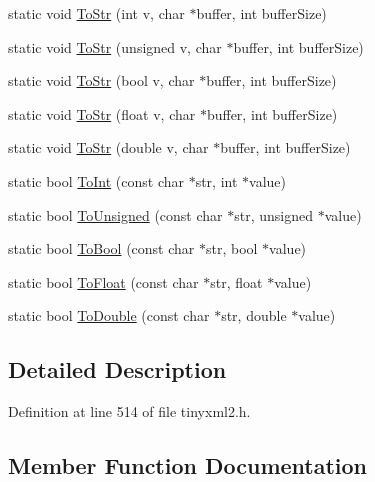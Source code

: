 \begin{DoxyCompactItemize}
\item 
static void \hyperlink{classtinyxml2_1_1_x_m_l_util_a3cd6c703d49b9d51bdf0f4ff6aa021c7}{To\+Str} (int v, char $\ast$buffer, int buffer\+Size)
\item 
static void \hyperlink{classtinyxml2_1_1_x_m_l_util_ac00c2e52c1c36dab3ff41d86a9bf60f9}{To\+Str} (unsigned v, char $\ast$buffer, int buffer\+Size)
\item 
static void \hyperlink{classtinyxml2_1_1_x_m_l_util_adba0718527ae9e80f663a71ea325cb11}{To\+Str} (bool v, char $\ast$buffer, int buffer\+Size)
\item 
static void \hyperlink{classtinyxml2_1_1_x_m_l_util_a8957ad44fee5fa02ba52d73aad4d0a31}{To\+Str} (float v, char $\ast$buffer, int buffer\+Size)
\item 
static void \hyperlink{classtinyxml2_1_1_x_m_l_util_a1cd141e50980fcddd6bf9af5de4b1db7}{To\+Str} (double v, char $\ast$buffer, int buffer\+Size)
\item 
static bool \hyperlink{classtinyxml2_1_1_x_m_l_util_ad4df4023d11ee3fca9689c49b9707323}{To\+Int} (const char $\ast$str, int $\ast$value)
\item 
static bool \hyperlink{classtinyxml2_1_1_x_m_l_util_a210c8637d5eb4ce3d4625294af0efc2f}{To\+Unsigned} (const char $\ast$str, unsigned $\ast$value)
\item 
static bool \hyperlink{classtinyxml2_1_1_x_m_l_util_ae5b03e0a1ca5d42052a7ac540f7aa12a}{To\+Bool} (const char $\ast$str, bool $\ast$value)
\item 
static bool \hyperlink{classtinyxml2_1_1_x_m_l_util_a399e71edb5f29d61ea81d91ee0332bb9}{To\+Float} (const char $\ast$str, float $\ast$value)
\item 
static bool \hyperlink{classtinyxml2_1_1_x_m_l_util_ad8f75ac140fb19c1c6e164a957c4cd53}{To\+Double} (const char $\ast$str, double $\ast$value)
\end{DoxyCompactItemize}


\subsection{Detailed Description}


Definition at line 514 of file tinyxml2.\+h.



\subsection{Member Function Documentation}
\hypertarget{classtinyxml2_1_1_x_m_l_util_a31c00d5c5dfb38382de1dfcaf4be3595}{}
